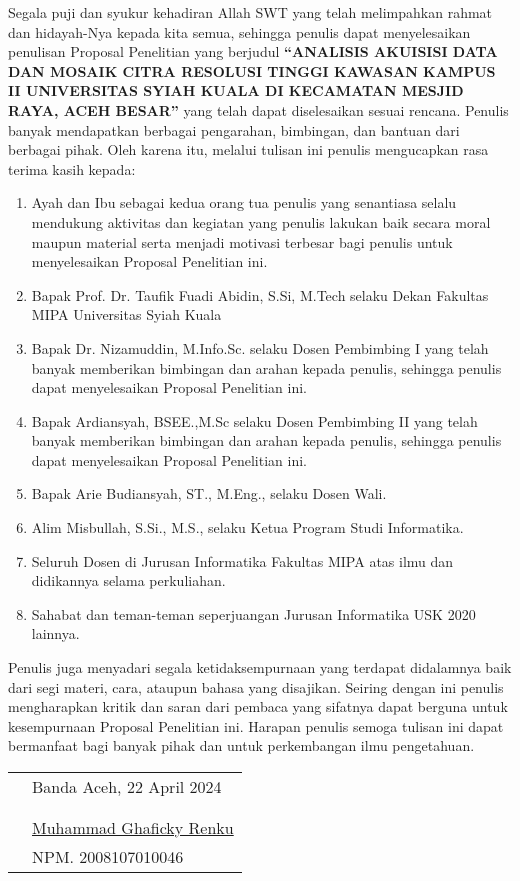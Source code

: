 \preface %


Segala puji dan syukur kehadiran Allah SWT yang telah melimpahkan rahmat dan hidayah-Nya kepada kita semua, sehingga penulis dapat menyelesaikan penulisan Proposal Penelitian yang berjudul \textbf{“ANALISIS AKUISISI DATA DAN MOSAIK CITRA 
RESOLUSI TINGGI KAWASAN KAMPUS II 
UNIVERSITAS SYIAH KUALA DI KECAMATAN 
MESJID RAYA, ACEH BESAR”} yang telah dapat diselesaikan sesuai rencana. Penulis banyak mendapatkan berbagai pengarahan, bimbingan, dan bantuan dari berbagai pihak. Oleh karena itu, melalui tulisan ini penulis mengucapkan rasa terima kasih kepada:

\begin{enumerate}
	\item{Ayah dan Ibu sebagai kedua orang tua penulis yang senantiasa selalu mendukung aktivitas dan kegiatan yang penulis lakukan baik secara moral maupun material serta menjadi motivasi terbesar bagi penulis untuk menyelesaikan Proposal Penelitian ini.}
    \item{Bapak Prof. Dr. Taufik Fuadi Abidin, S.Si, M.Tech selaku Dekan Fakultas MIPA Universitas Syiah Kuala} 
	\item{Bapak Dr. Nizamuddin, M.Info.Sc. selaku Dosen Pembimbing I yang telah banyak memberikan bimbingan dan arahan kepada penulis, sehingga penulis dapat menyelesaikan Proposal Penelitian ini.}
	\item{Bapak Ardiansyah, BSEE.,M.Sc selaku Dosen Pembimbing II yang telah banyak memberikan bimbingan dan arahan kepada penulis, sehingga penulis dapat menyelesaikan Proposal Penelitian ini.}
	\item{Bapak Arie Budiansyah, ST., M.Eng., selaku Dosen Wali.}
	\item {Alim Misbullah, S.Si., M.S., selaku Ketua Program Studi Informatika.}
	\item{Seluruh Dosen di Jurusan Informatika Fakultas MIPA atas ilmu dan didikannya selama perkuliahan.}
	\item{Sahabat dan teman-teman seperjuangan Jurusan Informatika USK 2020 lainnya.}
\end{enumerate}


Penulis juga menyadari segala ketidaksempurnaan yang terdapat didalamnya baik dari segi materi, cara, ataupun bahasa yang disajikan. Seiring dengan ini penulis mengharapkan kritik dan saran dari pembaca yang sifatnya dapat berguna untuk kesempurnaan Proposal Penelitian ini. Harapan penulis semoga tulisan ini dapat bermanfaat bagi banyak pihak dan untuk perkembangan ilmu pengetahuan.

\vspace{1cm}


\begin{tabular}{p{7.5cm}l}
	&Banda Aceh, 22 April 2024\\
	&\\
	&\\
	&\multirow{1.5}{7.5cm}{\underline{Muhammad Ghaficky Renku}} \\ 
	&NPM. 2008107010046 \\
\end{tabular}
